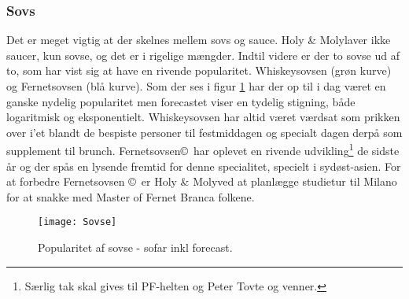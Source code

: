 \subsubsection{Sovs}
Det er meget vigtig at der skelnes mellem sovs og sauce. Holy \& Moly\texttrademark laver ikke saucer, kun sovse, og det er i rigelige mængder. Indtil videre er der to sovse ud af to, som har vist sig at have en rivende popularitet. Whiskeysovsen (grøn kurve) og Fernetsovsen (blå kurve). Som der ses i figur \ref{fig:Sovse} har der op til i dag været en ganske nydelig popularitet men forecastet viser en tydelig stigning, både logaritmisk og eksponentielt. Whiskeysovsen har altid været værdsat som prikken over i'et blandt de bespiste personer til festmiddagen og specialt dagen derpå som supplement til brunch. Fernetsovsen\textregistered \copyright \texttrademark \, har oplevet en rivende udvikling\footnote{Særlig tak skal gives til PF-helten og Peter Tovte og venner.} de sidste år og der spås en lysende fremtid for denne specialitet, specielt i sydøst-asien. For at forbedre Fernetsovsen \textregistered \copyright \texttrademark \, er Holy \& Moly\texttrademark ved at planlægge studietur til Milano for at snakke med Master of Fernet Branca folkene. 
\begin{figure}[h!]
\centering
\texttt{[image: Sovse]}
\caption{Popularitet af sovse - sofar inkl forecast.}
\label{fig:Sovse}
\end{figure}